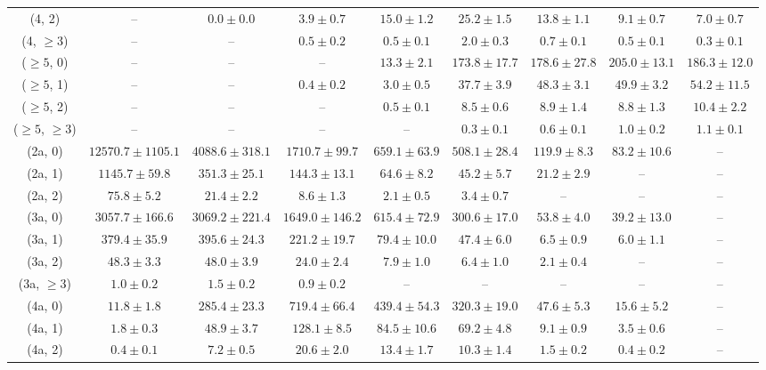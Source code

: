 \begin{table}[h!]
{\begin{tabular}{ccccccccc}
	(4, 2) & -- & $0.0\pm 0.0$ & $3.9\pm 0.7$ & $15.0\pm 1.2$ & $25.2\pm 1.5$ & $13.8\pm 1.1$ & $9.1\pm 0.7$ & $7.0\pm 0.7$ \\[0.5ex] 
	(4, $\ge3$) & -- & -- & $0.5\pm 0.2$ & $0.5\pm 0.1$ & $2.0\pm 0.3$ & $0.7\pm 0.1$ & $0.5\pm 0.1$ & $0.3\pm 0.1$ \\[0.5ex] 
	($\ge5$, 0) & -- & -- & -- & $13.3\pm 2.1$ & $173.8\pm 17.7$ & $178.6\pm 27.8$ & $205.0\pm 13.1$ & $186.3\pm 12.0$ \\[0.5ex] 
	($\ge5$, 1) & -- & -- & $0.4\pm 0.2$ & $3.0\pm 0.5$ & $37.7\pm 3.9$ & $48.3\pm 3.1$ & $49.9\pm 3.2$ & $54.2\pm 11.5$ \\[0.5ex] 
	($\ge5$, 2) & -- & -- & -- & $0.5\pm 0.1$ & $8.5\pm 0.6$ & $8.9\pm 1.4$ & $8.8\pm 1.3$ & $10.4\pm 2.2$ \\[0.5ex] 
	($\ge5$, $\ge3$) & -- & -- & -- & -- & $0.3\pm 0.1$ & $0.6\pm 0.1$ & $1.0\pm 0.2$ & $1.1\pm 0.1$ \\[0.5ex] 
	(2a, 0) & $12570.7\pm 1105.1$ & $4088.6\pm 318.1$ & $1710.7\pm 99.7$ & $659.1\pm 63.9$ & $508.1\pm 28.4$ & $119.9\pm 8.3$ & $83.2\pm 10.6$ & -- \\[0.5ex] 
	(2a, 1) & $1145.7\pm 59.8$ & $351.3\pm 25.1$ & $144.3\pm 13.1$ & $64.6\pm 8.2$ & $45.2\pm 5.7$ & $21.2\pm 2.9$ & -- & -- \\[0.5ex] 
	(2a, 2) & $75.8\pm 5.2$ & $21.4\pm 2.2$ & $8.6\pm 1.3$ & $2.1\pm 0.5$ & $3.4\pm 0.7$ & -- & -- & -- \\[0.5ex] 
	(3a, 0) & $3057.7\pm 166.6$ & $3069.2\pm 221.4$ & $1649.0\pm 146.2$ & $615.4\pm 72.9$ & $300.6\pm 17.0$ & $53.8\pm 4.0$ & $39.2\pm 13.0$ & -- \\[0.5ex] 
	(3a, 1) & $379.4\pm 35.9$ & $395.6\pm 24.3$ & $221.2\pm 19.7$ & $79.4\pm 10.0$ & $47.4\pm 6.0$ & $6.5\pm 0.9$ & $6.0\pm 1.1$ & -- \\[0.5ex] 
	(3a, 2) & $48.3\pm 3.3$ & $48.0\pm 3.9$ & $24.0\pm 2.4$ & $7.9\pm 1.0$ & $6.4\pm 1.0$ & $2.1\pm 0.4$ & -- & -- \\[0.5ex] 
	(3a, $\ge3$) & $1.0\pm 0.2$ & $1.5\pm 0.2$ & $0.9\pm 0.2$ & -- & -- & -- & -- & -- \\[0.5ex] 
	(4a, 0) & $11.8\pm 1.8$ & $285.4\pm 23.3$ & $719.4\pm 66.4$ & $439.4\pm 54.3$ & $320.3\pm 19.0$ & $47.6\pm 5.3$ & $15.6\pm 5.2$ & -- \\[0.5ex] 
	(4a, 1) & $1.8\pm 0.3$ & $48.9\pm 3.7$ & $128.1\pm 8.5$ & $84.5\pm 10.6$ & $69.2\pm 4.8$ & $9.1\pm 0.9$ & $3.5\pm 0.6$ & -- \\[0.5ex] 
	(4a, 2) & $0.4\pm 0.1$ & $7.2\pm 0.5$ & $20.6\pm 2.0$ & $13.4\pm 1.7$ & $10.3\pm 1.4$ & $1.5\pm 0.2$ & $0.4\pm 0.2$ & -- \\[0.5ex] 

\end{tabular}}
\end{table}
